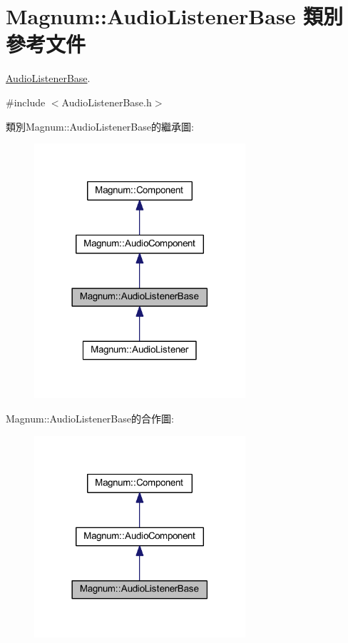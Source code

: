 \hypertarget{class_magnum_1_1_audio_listener_base}{}\section{Magnum\+:\+:Audio\+Listener\+Base 類別 參考文件}
\label{class_magnum_1_1_audio_listener_base}


\hyperlink{class_magnum_1_1_audio_listener_base}{Audio\+Listener\+Base}.  




{\ttfamily \#include $<$Audio\+Listener\+Base.\+h$>$}



類別\+Magnum\+:\+:Audio\+Listener\+Base的繼承圖\+:\nopagebreak
\begin{figure}[H]
\begin{center}
\leavevmode
\includegraphics[width=222pt]{class_magnum_1_1_audio_listener_base__inherit__graph}
\end{center}
\end{figure}


Magnum\+:\+:Audio\+Listener\+Base的合作圖\+:\nopagebreak
\begin{figure}[H]
\begin{center}
\leavevmode
\includegraphics[width=222pt]{class_magnum_1_1_audio_listener_base__coll__graph}
\end{center}
\end{figure}
